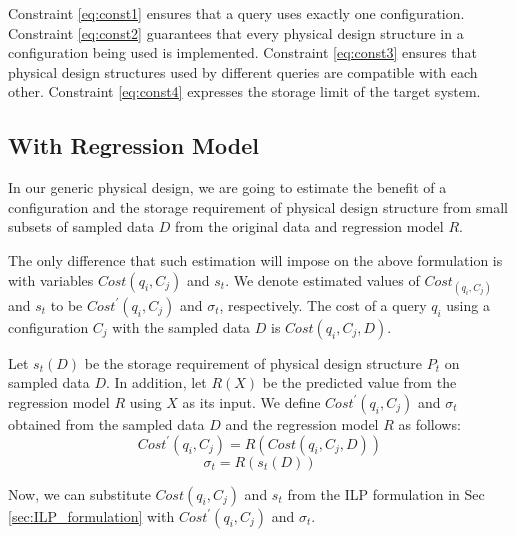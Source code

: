 \documentclass[10pt]{article}
\newcommand{\dy}[1]{\textcolor{blue}{DY: #1}}
\begin{document}
Constraint \eqref{eq:const1} ensures that a query uses exactly one configuration.
Constraint \eqref{eq:const2} guarantees that every physical design structure in a configuration being
used is implemented.
Constraint \eqref{eq:const3} ensures that physical design structures used by different queries are
compatible with each other.
Constraint \eqref{eq:const4} expresses the storage limit of the target system.

\subsection{With Regression Model}
In our generic physical design, we are going to estimate the benefit of a configuration and the
storage requirement of physical design structure from small subsets of sampled data $D$ from the
original data and regression model $R$.

The only difference that such estimation will impose on the above formulation is with variables
$Cost(q_i, C_j)$ and $s_{t}$.
We denote estimated values of $Cost_(q_i, C_j)$ and $s_{t}$ to be $Cost^\prime(q_i,C_j)$ and
$\sigma_{t}$, respectively.
The cost of a query $q_i$ using a configuration $C_j$ with the sampled data $D$ is
$Cost(q_i, C_j, D)$.

Let $s_t (D)$ be the storage requirement of physical design structure $P_t$ on sampled data $D$.
In addition, let $R(X)$ be the predicted value from the regression model $R$ using $X$ as its input.
We define $Cost^\prime (q_i,C_j)$ and $\sigma_{t}$ obtained from the sampled data $D$ and
the regression model $R$ as follows:
\begin{equation}
  Cost^\prime (q_i,C_j) = R(Cost(q_i, C_j, D))
  \label{eq:regress1}
\end{equation}
\begin{equation}
  \sigma_{t} = R(s_t (D))
\end{equation}

Now, we can substitute $Cost(q_i,C_j)$ and $s_t$ from the ILP formulation in
Sec \ref{sec:ILP_formulation} with $Cost^\prime (q_i,C_j)$ and $\sigma_{t}$.



\end{document}
